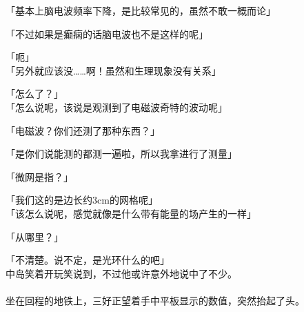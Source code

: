 「基本上脑电波频率下降，是比较常见的，虽然不敢一概而论」

「不过如果是癫痫的话脑电波也不是这样的呢」

「呃」\\

「另外就应该没……啊！虽然和生理现象没有关系」

「怎么了？」\\

「怎么说呢，该说是观测到了电磁波奇特的波动呢」

「电磁波？你们还测了那种东西？」

「是你们说能测的都测一遍啦，所以我拿进行了测量」

「微网是指？」

「我们这的是边长约3cm的网格呢」\\

「该怎么说呢，感觉就像是什么带有能量的场产生的一样」

「从哪里？」

「不清楚。说不定，是光环什么的吧」\\

中岛笑着开玩笑说到，不过他或许意外地说中了不少。\\

\sqsplit\\

坐在回程的地铁上，三好正望着手中平板显示的数值，突然抬起了头。\\

